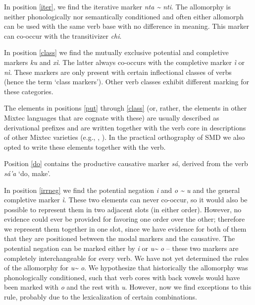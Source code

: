 \documentclass[output=paper]{langscibook}
\begin{document}
In position \ref{iter}, we find the iterative marker \textit{nta \textasciitilde{} nti}. The allomorphy is neither phonologically nor semantically conditioned and often either allomorph can be used with the same verb base with no difference in meaning. This marker can co-occur with the transitivizer \textit{chi}.

In position \ref{class} we find the mutually exclusive potential and completive markers \textit{ku} and \textit{xì}. The latter always co-occurs with the completive marker \textit{ì} or \textit{nì}. 
These markers are only present with certain inflectional classes of verbs (hence the term `class markers'). Other verb classes exhibit different marking for these categories.

The elements in positions \ref{put} through \ref{class} (or, rather, the elements in other Mixtec languages that are cognate with these) are usually described as derivational prefixes and are written together with the verb core in descriptions of other Mixtec varieties (e.g., \citealt{macaulay1996grammar}, \citealt{hollenbach2013gramatica}). 
In the practical orthography of SMD we also opted to write these elements together with the verb. 

Position \ref{do} contains the productive causative marker \textit{sá}, derived from the verb \textit{sá'a} `do, make'.

In position \ref{irrneg} we find the potential negation \textit{i} and \textit{o \textasciitilde{} u} and the general completive marker \textit{ì}. These two elements can never co-occur, so it would also be possible to represent them in two adjacent slots (in either order). However, no evidence could ever be provided for favoring one order over the other; therefore we represent them together in one slot, since we have evidence for both of them that they are positioned between the modal markers and the causative. 
The potential negation can be marked either by \textit{i} or \textit{u\textasciitilde{} o} -- these two markers are completely interchangeable for every verb. 
We have not yet determined the rules of the allomorphy for \textit{u\textasciitilde{} o}. We hypothesize that historically the allomorphy was phonologically conditioned, such that verb cores with back vowels would have been marked with \textit{o} and the rest with \textit{u}. However, now we find exceptions to this rule, probably due to the lexicalization of certain combinations. 
\end{document}

